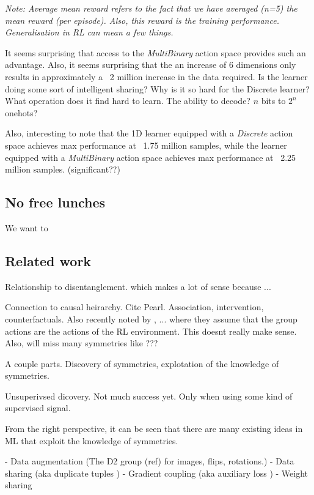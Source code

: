 \textit{Note: Average mean reward refers to the fact that we have averaged (n=5)
the mean reward (per episode). Also, this reward is the training performance.
Generalisation in RL can mean a few things.}

It seems surprising that access to the \textit{MultiBinary} action space provides such an advantage.
Also, it seems surprising that the an increase of 6 dimensions only results in approximately a ~2 million increase in the data required.
Is the learner doing some sort of intelligent sharing?
Why is it so hard for the Discrete learner? What operation does it find hard to learn. The ability to decode? $n$ bits to $2^n$ onehots?

Also, interesting to note that the 1D learner equipped with a \textit{Discrete}
action space achieves max performance at ~1.75 million samples, while the learner
equipped with a \textit{MultiBinary} action space achieves max performance at ~2.25 million samples. (significant??)

\subsection{No free lunches}

We want to


\subsection{Related work}

Relationship to disentanglement. \cite{Higgins2018} which makes a lot of sense because ...

Connection to causal heirarchy. Cite Pearl. Association, intervention, counterfactuals.
Also recently noted by \cite{Caselles-Dupre2019}, ... where they assume that
the group actions are the actions of the RL environment.
This doesnt really make sense. Also, will miss many symmetries like ???

A couple parts. Discovery of symmetries, explotation of the knowledge of symmetries.

Unsuperivsed dicovery. Not much success yet. Only when using some kind of supervised signal.


From the right perspective, it can be seen that there are many existing ideas in
 ML that exploit the knowledge of symmetries.

- Data augmentation (The D2 group (ref) for images, flips, rotations.)
- Data sharing (aka duplicate tuples \cite{Ho2019a})
- Gradient coupling (aka auxiliary loss \cite{Ho2019a})
- Weight sharing \cite{Ravanbakhsh2017a}

